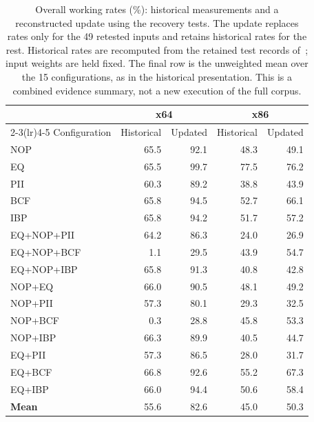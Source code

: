\begin{table}[t]
\caption{Overall working rates (\%): historical measurements and a
reconstructed update using the recovery tests. The update replaces rates
only for the 49 retested inputs and retains historical rates for the rest.
Historical rates are recomputed from the retained test records of~\cite{zone_secrypt_2026}; input weights are held fixed. The final row is the unweighted
mean over the 15 configurations, as in the historical presentation.
This is a combined evidence summary, not a new execution of the full corpus.}
\label{tab:overall_working_update}
\centering\small\setlength{\tabcolsep}{5pt}
\begin{tabular}{@{}lrrrr@{}}
\toprule
 & \multicolumn{2}{c}{x64} & \multicolumn{2}{c}{x86} \\
\cmidrule(lr){2-3}\cmidrule(lr){4-5}
Configuration & Historical & Updated & Historical & Updated \\
\midrule
NOP & 65.5 & 92.1 & 48.3 & 49.1 \\
EQ & 65.5 & 99.7 & 77.5 & 76.2 \\
PII & 60.3 & 89.2 & 38.8 & 43.9 \\
BCF & 65.8 & 94.5 & 52.7 & 66.1 \\
IBP & 65.8 & 94.2 & 51.7 & 57.2 \\
EQ+NOP+PII & 64.2 & 86.3 & 24.0 & 26.9 \\
EQ+NOP+BCF & 1.1 & 29.5 & 43.9 & 54.7 \\
EQ+NOP+IBP & 65.8 & 91.3 & 40.8 & 42.8 \\
NOP+EQ & 66.0 & 90.5 & 48.1 & 49.2 \\
NOP+PII & 57.3 & 80.1 & 29.3 & 32.5 \\
NOP+BCF & 0.3 & 28.8 & 45.8 & 53.3 \\
NOP+IBP & 66.3 & 89.9 & 40.5 & 44.7 \\
EQ+PII & 57.3 & 86.5 & 28.0 & 31.7 \\
EQ+BCF & 66.8 & 92.6 & 55.2 & 67.3 \\
EQ+IBP & 66.0 & 94.4 & 50.6 & 58.4 \\
\midrule
\textbf{Mean} & 55.6 & 82.6 & 45.0 & 50.3 \\
\bottomrule
\end{tabular}
\end{table}

